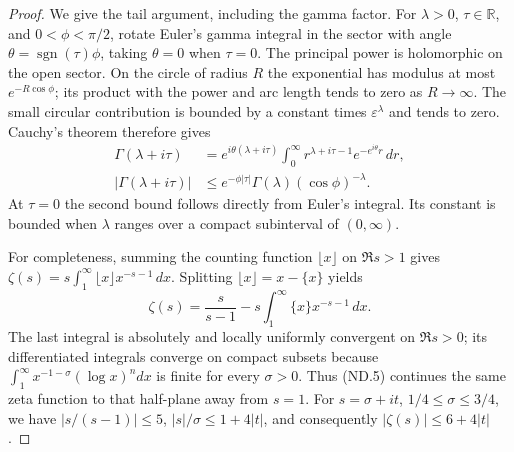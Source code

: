 \begin{proof}
We give the tail argument, including the gamma factor. For
\(\lambda>0\), \(\tau\in\mathbb R\), and
\(0<\phi<\pi/2\), rotate Euler's gamma integral in the sector with
angle \(\theta=\operatorname{sgn}(\tau)\phi\), taking \(\theta=0\)
when \(\tau=0\). The principal power is holomorphic on the open
sector. On the circle of radius \(R\) the exponential has modulus at
most \(e^{-R\cos\phi}\); its product with the power and arc length
tends to zero as \(R\to\infty\). The small circular contribution
is bounded by a constant times \(\varepsilon^\lambda\) and tends
to zero. Cauchy's theorem therefore gives
\[
 \begin{aligned}
 \Gamma(\lambda+i\tau)
 &=e^{i\theta(\lambda+i\tau)}
       \int_0^\infty r^{\lambda+i\tau-1}e^{-e^{i\theta}r}\,dr,\\
 |\Gamma(\lambda+i\tau)|
 &\le e^{-\phi|\tau|}\Gamma(\lambda)(\cos\phi)^{-\lambda}.
 \end{aligned}
 \tag{ND.4}
\]
At \(\tau=0\) the second bound follows directly from Euler's
integral. Its constant is bounded when \(\lambda\) ranges over a
compact subinterval of \((0,\infty)\).

For completeness, summing the counting function \(\lfloor x\rfloor\)
on \(\Re s>1\) gives
\(\zeta(s)=s\int_1^\infty\lfloor x\rfloor x^{-s-1}\,dx\).
Splitting \(\lfloor x\rfloor=x-\{x\}\) yields
\[
 \zeta(s)=\frac{s}{s-1}
           -s\int_1^\infty\{x\}x^{-s-1}\,dx.
 \tag{ND.5}
\]
The last integral is absolutely and locally uniformly convergent on
\(\Re s>0\); its differentiated integrals converge on compact
subsets because \(\int_1^\infty x^{-1-\sigma}(\log x)^n dx\)
is finite for every \(\sigma>0\). Thus (ND.5) continues the same
zeta function to that half-plane away from \(s=1\).
For \(s=\sigma+it\), \(1/4\le\sigma\le3/4\), we have
\(|s/(s-1)|\le5\), \(|s|/\sigma\le1+4|t|\), and consequently
\(|\zeta(s)|\le6+4|t|\).


\end{proof}
